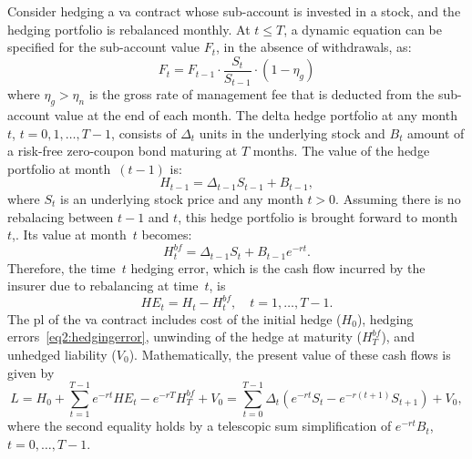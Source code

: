 Consider hedging a \gls{va} contract whose sub-account is invested in a stock, and the hedging portfolio is rebalanced monthly.
At $t \leq T$, a dynamic equation can be specified for the sub-account value $F_t$, in the absence of withdrawals, as:
\begin{equation*}
    F_t = F_{t-1} \cdot \frac{S_t}{S_{t-1}} \cdot (1-\eta_g)
\end{equation*}
where $\eta_g> \eta_n$ is the gross rate of management fee that is deducted from the sub-account value at the end of each month.
The delta hedge portfolio at any month~$t$, $t=0,1,\ldots,T-1$, consists of $\Delta_t$ units in the underlying stock and $B_t$ amount of a risk-free zero-coupon bond maturing at $T$ months.
The value of the hedge portfolio at month~$(t-1)$ is:
\begin{equation*}
    H_{t-1} = \Delta_{t-1} S_{t-1} + B_{t-1},
\end{equation*}
where $S_t$ is an underlying stock price and any month $t>0$.
Assuming there is no rebalacing between $t-1$ and $t$, this hedge portfolio is brought forward to month~$t$,.
Its value at month~$t$ becomes:
\begin{equation*}
    H_{t}^{bf} = \Delta_{t-1} S_{t} + B_{t-1}e^{-rt}.
\end{equation*}
Therefore, the time~$t$ hedging error, which is the cash flow incurred by the insurer due to rebalancing at time~$t$, is
\begin{equation}\label{eq2:hedgingerror}
    HE_t = H_t - H^{bf}_t, \quad t=1,\ldots, T-1.
\end{equation}
The \gls{pl} of the \gls{va} contract includes cost of the initial hedge ($H_0$), hedging errors~\eqref{eq2:hedgingerror}, unwinding of the hedge at maturity ($H^{bf}_T$), and unhedged liability ($V_0$).
Mathematically, the present value of these cash flows is given by
\begin{equation}\label{eq2:lossrv}
L = H_0 + \sum_{t=1}^{T-1} e^{-rt} HE_t - e^{-rT} H^{bf}_T + V_0 = \sum_{t=0}^{T-1}\Delta_t (e^{-rt}S_t - e^{-r(t+1)}S_{t+1}) + V_0,
\end{equation}
where the second equality holds by a telescopic sum simplification of $e^{-rt}B_t$, $t=0,\ldots,T-1$.


